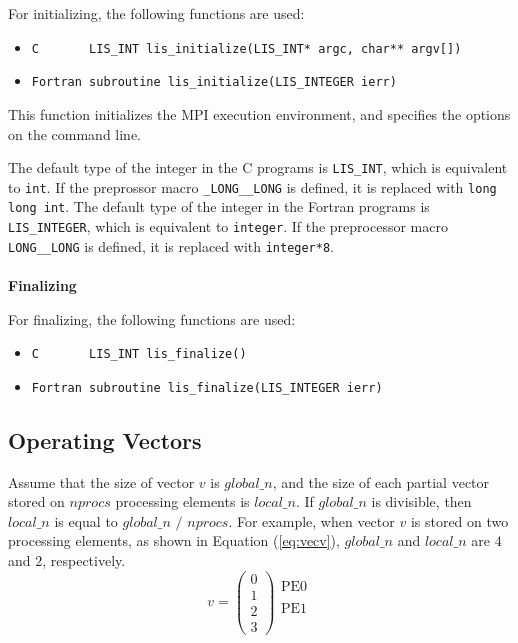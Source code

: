 \documentclass[a4paper]{article}
\begin{document}
For initializing, the following functions are used:
\begin{itemize}
\item \verb+C       LIS_INT lis_initialize(LIS_INT* argc, char** argv[])+
\item \verb+Fortran subroutine lis_initialize(LIS_INTEGER ierr)+
\end{itemize}
This function initializes the MPI execution environment, 
and specifies the options on the command line.

The default type of the integer in the C programs is {\tt LIS\_INT}, which
is equivalent to {\tt int}.  If the preprossor macro {\tt \_LONG\_\_LONG}
is defined, it is replaced with {\tt long long int}.
The default type of the integer in the Fortran programs is 
{\tt LIS\_INTEGER}, which is equivalent to {\tt integer}.  If the
preprocessor macro {\tt LONG\_\_LONG} is defined, it is replaced with 
{\tt integer*8}.
\\ \\
\noindent
{\bf Finalizing}

For finalizing, the following functions are used: 
\begin{itemize}
\item \verb+C       LIS_INT lis_finalize()+
\item \verb+Fortran subroutine lis_finalize(LIS_INTEGER ierr)+
\end{itemize}

\subsection{Operating Vectors}
Assume that the size of vector $v$ is $global\_n$, and the size 
of each partial vector stored on $nprocs$ processing elements is $local\_n$. 
If $global\_n$ is divisible, 
then $local\_n$ is equal to $global\_n$ $/$ $nprocs$. 
For example, when vector $v$ is stored on two processing elements, 
as shown in Equation (\ref{eq:vecv}), $global\_n$ and $local\_n$ 
are $4$ and $2$, respectively.
\begin{equation}
v = 
\left(
\begin{array}{c}
0 \\
1 \\ \hline
2 \\
3  
\end{array}
\right)
\begin{array}{l}
\mbox{PE0} \\
    \\
\mbox{PE1} \\
   \\ 
\end{array}
\label{eq:vecv}
\end{equation}
\end{document}
